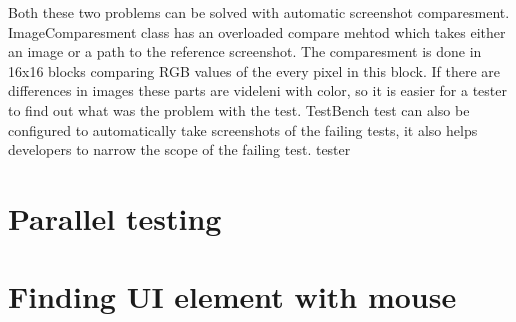 Both these two problems can be solved with automatic screenshot comparesment.
ImageComparesment class has an overloaded compare mehtod which takes either an
image or a path to the reference screenshot. The comparesment is done in 16x16
blocks comparing RGB values of the every pixel in this block. If there are
differences in images these parts are videleni with color, so it is easier for a
tester to find out what was the problem with the test. TestBench test can also
be configured to automatically take screenshots of the failing tests, it also
helps developers to narrow the scope of the failing test. 
tester


\section{Parallel testing}

\section{Finding UI element with mouse}
